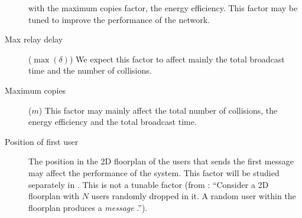 \begin{description}
		with the maximum copies factor, the energy efficiency. This
		factor may be tuned to improve the performance of the network.
	\item[Max relay delay] (\(\max(\delta)\)) We expect this factor to
		affect mainly the total broadcast time and the number of
		collisions.
	\item[Maximum copies] (\(m\)) This factor may mainly affect the total
		number of collisions, the energy efficiency and the total
		broadcast time.
	\item[Position of first user] The position in the 2D floorplan of the
		users that sends the first message may affect the performance of
		the system. This factor will be studied separately in
		. This is not a tunable factor (from
		: ``Consider a 2D floorplan with \(N\) users
		randomly dropped in it. A random user within the floorplan
		produces a \emph{message} \elision.'').
\end{description}
